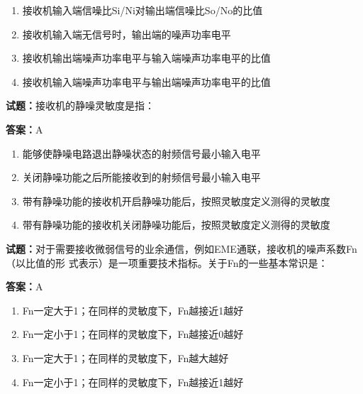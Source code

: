 \documentclass{ctexbook}
\begin{document}
\begin{enumerate}[leftmargin=3em]
  \item 接收机输入端信噪比Si/Ni对输出端信噪比So/No的比值 

  \item 接收机输入端无信号时，输出端的噪声功率电平 

  \item 接收机输出端噪声功率电平与输入端噪声功率电平的比值 

  \item 接收机输入端噪声功率电平与输出端噪声功率电平的比值 

\end{enumerate}





\vspace{1em}

\textbf{试题：}接收机的静噪灵敏度是指： 

\textbf{答案：}A 

\begin{enumerate}[leftmargin=3em]
  \item 能够使静噪电路退出静噪状态的射频信号最小输入电平 

  \item 关闭静噪功能之后所能接收到的射频信号最小输入电平 

  \item 带有静噪功能的接收机开启静噪功能后，按照灵敏度定义测得的灵敏度 

  \item 带有静噪功能的接收机关闭静噪功能后，按照灵敏度定义测得的灵敏度 

\end{enumerate}





\vspace{1em}

\textbf{试题：}对于需要接收微弱信号的业余通信，例如EME通联，接收机的噪声系数Fn（以比值的形
式表示）是一项重要技术指标。关于Fn的一些基本常识是： 

\textbf{答案：}A 

\begin{enumerate}[leftmargin=3em]
  \item Fn一定大于1；在同样的灵敏度下，Fn越接近1越好 

  \item Fn一定小于1；在同样的灵敏度下，Fn越接近0越好 

  \item Fn一定大于1；在同样的灵敏度下，Fn越大越好 

  \item Fn一定小于1；在同样的灵敏度下，Fn越接近1越好 

\end{enumerate}
\end{document}
